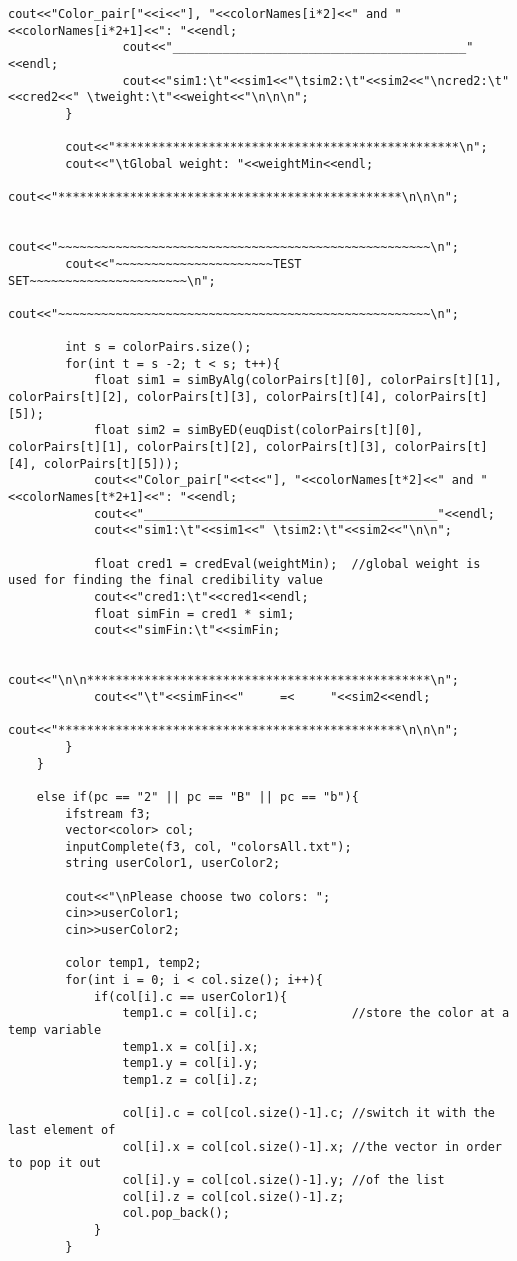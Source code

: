 \documentclass[egilmezThesis.tex]{subfiles}
\begin{document}
\begin{lstlisting}[caption=The C++ implementation of the application concerning colors, breaklines=true]
				cout<<"Color_pair["<<i<<"], "<<colorNames[i*2]<<" and "<<colorNames[i*2+1]<<": "<<endl;
				cout<<"_________________________________________"<<endl;
				cout<<"sim1:\t"<<sim1<<"\tsim2:\t"<<sim2<<"\ncred2:\t"<<cred2<<" \tweight:\t"<<weight<<"\n\n\n";
		}

		cout<<"************************************************\n";
		cout<<"\tGlobal weight: "<<weightMin<<endl;
		cout<<"************************************************\n\n\n";

		cout<<"~~~~~~~~~~~~~~~~~~~~~~~~~~~~~~~~~~~~~~~~~~~~~~~~~~~~\n";
		cout<<"~~~~~~~~~~~~~~~~~~~~~~TEST SET~~~~~~~~~~~~~~~~~~~~~~\n";
		cout<<"~~~~~~~~~~~~~~~~~~~~~~~~~~~~~~~~~~~~~~~~~~~~~~~~~~~~\n";

		int s = colorPairs.size();
		for(int t = s -2; t < s; t++){
			float sim1 = simByAlg(colorPairs[t][0], colorPairs[t][1], colorPairs[t][2], colorPairs[t][3], colorPairs[t][4], colorPairs[t][5]);
			float sim2 = simByED(euqDist(colorPairs[t][0], colorPairs[t][1], colorPairs[t][2], colorPairs[t][3], colorPairs[t][4], colorPairs[t][5]));
			cout<<"Color_pair["<<t<<"], "<<colorNames[t*2]<<" and "<<colorNames[t*2+1]<<": "<<endl;
			cout<<"_________________________________________"<<endl;
			cout<<"sim1:\t"<<sim1<<" \tsim2:\t"<<sim2<<"\n\n";

			float cred1 = credEval(weightMin);	//global weight is used for finding the final credibility value
			cout<<"cred1:\t"<<cred1<<endl;
			float simFin = cred1 * sim1;
			cout<<"simFin:\t"<<simFin;

			cout<<"\n\n************************************************\n";
			cout<<"\t"<<simFin<<"     =<     "<<sim2<<endl;
			cout<<"************************************************\n\n\n";
		}
	}

	else if(pc == "2" || pc == "B" || pc == "b"){
		ifstream f3;
		vector<color> col;
		inputComplete(f3, col, "colorsAll.txt");
		string userColor1, userColor2;

		cout<<"\nPlease choose two colors: ";
		cin>>userColor1;
		cin>>userColor2;

		color temp1, temp2;
		for(int i = 0; i < col.size(); i++){
			if(col[i].c == userColor1){
				temp1.c = col[i].c;				//store the color at a temp variable
				temp1.x = col[i].x;
				temp1.y = col[i].y;
				temp1.z = col[i].z;

				col[i].c = col[col.size()-1].c;	//switch it with the last element of
				col[i].x = col[col.size()-1].x;	//the vector in order to pop it out
				col[i].y = col[col.size()-1].y;	//of the list
				col[i].z = col[col.size()-1].z;
				col.pop_back();
			}
		}


\end{lstlisting}
\end{document}
